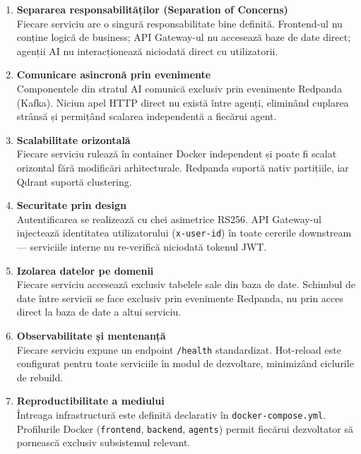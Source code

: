 \documentclass[12pt, a4paper]{report}
\begin{document}
\begin{enumerate}[leftmargin=*, label=\textbf{OD-\arabic*.}]

  \item \textbf{Separarea responsabilităților (Separation of Concerns)}\\
  Fiecare serviciu are o singură responsabilitate bine definită. Frontend-ul nu
  conține logică de business; API Gateway-ul nu accesează baze de date direct;
  agenții AI nu interacționează niciodată direct cu utilizatorii.

  \item \textbf{Comunicare asincronă prin evenimente}\\
  Componentele din stratul AI comunică exclusiv prin evenimente Redpanda (Kafka).
  Niciun apel HTTP direct nu există între agenți, eliminând cuplarea strânsă și
  permițând scalarea independentă a fiecărui agent.

  \item \textbf{Scalabilitate orizontală}\\
  Fiecare serviciu rulează în container Docker independent și poate fi scalat
  orizontal fără modificări arhitecturale. Redpanda suportă nativ partițiile,
  iar Qdrant suportă clustering.

  \item \textbf{Securitate prin design}\\
  Autentificarea se realizează cu chei asimetrice RS256. API Gateway-ul injectează
  identitatea utilizatorului (\texttt{x-user-id}) în toate cererile downstream —
  serviciile interne nu re-verifică niciodată tokenul JWT.

  \item \textbf{Izolarea datelor pe domenii}\\
  Fiecare serviciu accesează exclusiv tabelele sale din baza de date. Schimbul de
  date între servicii se face exclusiv prin evenimente Redpanda, nu prin acces
  direct la baza de date a altui serviciu.

  \item \textbf{Observabilitate și mentenanță}\\
  Fiecare serviciu expune un endpoint \texttt{/health} standardizat. Hot-reload
  este configurat pentru toate serviciile în modul de dezvoltare, minimizând
  ciclurile de rebuild.

  \item \textbf{Reproductibilitate a mediului}\\
  Întreaga infrastructură este definită declarativ în \texttt{docker-compose.yml}.
  Profilurile Docker (\texttt{frontend}, \texttt{backend}, \texttt{agents}) permit
  fiecărui dezvoltator să pornească exclusiv subsistemul relevant.

\end{enumerate}
\end{document}
